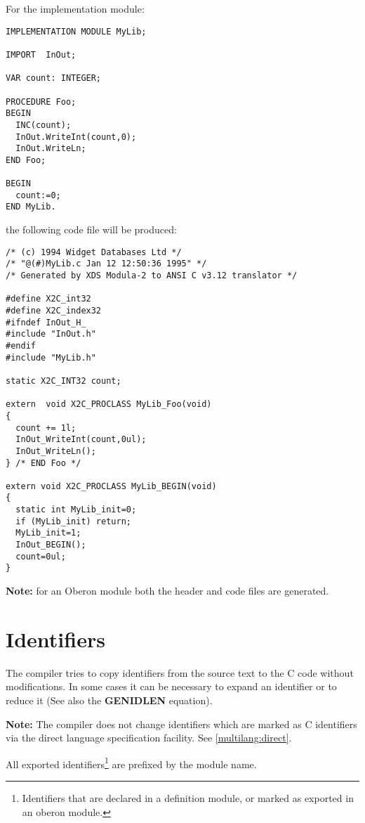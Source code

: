 \noindent
For the implementation module:
\begin{verbatim}
IMPLEMENTATION MODULE MyLib;

IMPORT  InOut;

VAR count: INTEGER;

PROCEDURE Foo;
BEGIN
  INC(count);
  InOut.WriteInt(count,0);
  InOut.WriteLn;
END Foo;

BEGIN
  count:=0;
END MyLib.
\end{verbatim}
the following code file will be produced:
{\small
\begin{verbatim}
/* (c) 1994 Widget Databases Ltd */
/* "@(#)MyLib.c Jan 12 12:50:36 1995" */
/* Generated by XDS Modula-2 to ANSI C v3.12 translator */

#define X2C_int32
#define X2C_index32
#ifndef InOut_H_
#include "InOut.h"
#endif
#include "MyLib.h"

static X2C_INT32 count;

extern  void X2C_PROCLASS MyLib_Foo(void)
{
  count += 1l;
  InOut_WriteInt(count,0ul);
  InOut_WriteLn();
} /* END Foo */

extern void X2C_PROCLASS MyLib_BEGIN(void)
{
  static int MyLib_init=0;
  if (MyLib_init) return;
  MyLib_init=1;
  InOut_BEGIN();
  count=0ul;
}
\end{verbatim}
}
{\bf Note:} for an Oberon module both the header and code files are
generated.

\section{Identifiers}\label{maptoc:idents}

The compiler tries to copy identifiers from the source text to
the C code without modifications. In some cases it can be
necessary to expand an identifier or to reduce it (See also the {\bf
GENIDLEN} equation).

{\bf Note:} The compiler does not change identifiers which are
marked as C identifiers via the direct language specification
facility. See \ref{multilang:direct}.

All exported identifiers\footnote{Identifiers that are declared
in a definition module, or marked as exported in an oberon module.} are
prefixed by the module name.

